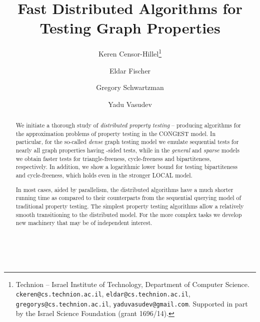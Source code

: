 \documentclass[11pt]{article}
\newcommand*\samethanks[1][\value{footnote}]{\footnotemark[#1]}
\begin{document}
\begin{titlepage}
\title{Fast Distributed Algorithms for Testing Graph Properties}
\author{Keren Censor-Hillel\thanks{Technion -- Israel Institute of Technology, Department of Computer
  Science. \texttt{ckeren@cs.technion.ac.il},
  \texttt{eldar@cs.technion.ac.il}, \texttt{gregorys@cs.technion.ac.il},
  \texttt{yaduvasudev@gmail.com}. Supported in part by the Israel Science Foundation (grant 1696/14).}
	\and Eldar Fischer\samethanks \and Gregory Schwartzman\samethanks \and Yadu Vasudev\samethanks }

\maketitle
	
\begin{abstract}
We initiate a thorough study of \emph{distributed property testing} -- producing algorithms for the approximation problems of property testing in the CONGEST model. In particular, for the so-called \emph{dense} graph testing model we emulate sequential tests for nearly all graph properties having -sided tests, while in the \emph{general} and \emph{sparse} models we obtain faster tests for triangle-freeness, cycle-freeness and bipartiteness, respectively. In addition, we show a logarithmic lower bound for testing bipartiteness and cycle-freeness, which holds even in the stronger LOCAL model.

In most cases, aided by parallelism, the distributed algorithms have a much shorter running time as compared to their counterparts from the sequential querying model of traditional property testing. The simplest property testing algorithms allow a relatively smooth transitioning to the distributed model. For the more complex tasks we develop new machinery that may be of independent interest.
\end{abstract}


~
\thispagestyle{empty}
\end{titlepage}

\newcommand{\ThmSim}
{
Any -test in the dense graph model for a non-disjointed property that makes  queries can be converted to a distributed -test that takes  communication rounds.
}
\newcommand{\ThmTri}{
Algorithm~\ref{alg:triangle-freeness} is a distributed -test in the general graph model for the property of containing no triangles, that requires  rounds.
}
\newcommand{\ThmBi}{
Algorithm~\ref{alg:dist-bip-test-det} is a distributed -test in the bounded degree graph model for the property of being bipartite, that requires  rounds.
}
\newcommand{\ThmCycle}{
Algorithm~\ref{alg:test-cycle-free} is a distributed -test in the general graph model
for the property of being cycle-free, that requires  rounds.
}
\newcommand{\ThmLBBi}{
Any distributed -test for the property of being bipartite requires
 rounds of communication.
}
\newcommand{\ThmLBCycle}{
Any distributed -test for the property of being cycle-free requires
 rounds of communication.
}
\end{document}
